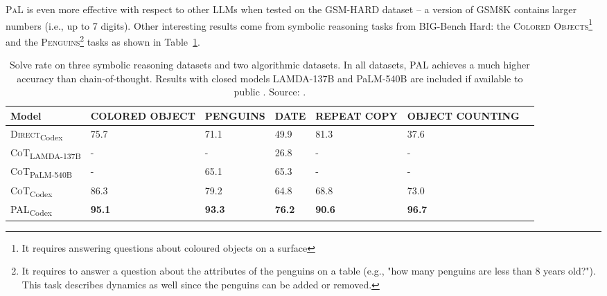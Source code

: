 \textsc{PaL} is even more effective with respect to other LLMs when tested on the GSM-HARD dataset -- a version of GSM8K contains larger numbers (i.e., up to 7 digits).
Other interesting results come from symbolic reasoning tasks from BIG-Bench Hard: the \textsc{Colored Objects}\footnote{It requires answering questions about coloured objects on a surface} and the \textsc{Penguins}\footnote{It requires to answer a question about the attributes of the penguins on a table (e.g., "how many penguins are less than 8 years old?"). This task describes dynamics as well since the penguins can be added or removed.} tasks as shown in Table~\ref{tab:pal-symbolic}.
\begin{table}[h!]
	\centering
	\small
	\begin{tabularx}{\textwidth}{XXXXXXX}
		\hline
		\textbf{Model}                         & \textbf{COLORED                                                                 \newline OBJECT} & \textbf{PENGUINS} & \textbf{DATE} & \textbf{REPEAT \newline COPY} & \textbf{OBJECT COUNTING} \\ \hline
		\textsc{Direct}\textsubscript{Codex}   & 75.7                                                                                             & 71.1              & 49.9          & 81.3                          & 37.6                     \\
		\textsc{CoT}\textsubscript{LAMDA-137B} & -                                                                                                & -                 & 26.8          & -                             & -                        \\
		\textsc{CoT}\textsubscript{PaLM-540B}  & -                                                                                                & 65.1              & 65.3          & -                             & -                        \\
		\textsc{CoT}\textsubscript{Codex}      & 86.3                                                                                             & 79.2              & 64.8          & 68.8                          & 73.0                     \\
		\textsc{PAL}\textsubscript{Codex}      & \textbf{95.1}                                                                                    & \textbf{93.3}     & \textbf{76.2} & \textbf{90.6}                 & \textbf{96.7}            \\ \hline
	\end{tabularx}
	\caption{Solve rate on three symbolic reasoning datasets and two algorithmic datasets. In all datasets, PAL achieves a much higher accuracy than chain-of-thought. Results with closed models LAMDA-137B and PaLM-540B are included if available to public \textcite{wei2022chain, suzgun2022challenging}. Source: \textcite{gao2022pal}.}
	\label{tab:pal-symbolic}
\end{table}
